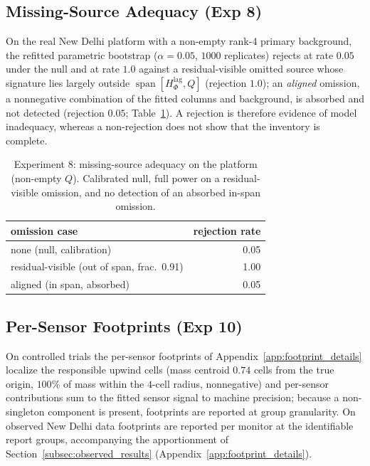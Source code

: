 \subsection{Missing-Source Adequacy (Exp 8)}
\label{subsec:results_missing_source}
On the real New Delhi platform with a non-empty rank-4 primary background, the
refitted parametric bootstrap ($\alpha=0.05$, $1000$ replicates) rejects at rate
$0.05$ under the null and at rate $1.0$ against a residual-visible omitted
source whose signature lies largely outside
$\operatorname{span}[H_\Phi^{\mathrm{lag}},Q]$ (rejection $1.0$); an \emph{aligned}
omission, a nonnegative combination of the fitted columns and background, is absorbed
and not detected (rejection $0.05$; Table~\ref{tab:results_missing}). A rejection is
therefore evidence of model inadequacy, whereas a non-rejection does not show that the
inventory is complete.
\begin{table}[t]
\centering
\footnotesize
\caption{Experiment 8: missing-source adequacy on the platform (non-empty $Q$).
Calibrated null, full power on a residual-visible omission, and no detection of an
absorbed in-span omission.}
\label{tab:results_missing}
\begin{tabular}{lr}
\toprule
omission case & rejection rate \\
\midrule
none (null, calibration) & 0.05 \\
residual-visible (out of span, frac.\ 0.91) & 1.00 \\
aligned (in span, absorbed) & 0.05 \\
\bottomrule
\end{tabular}
\end{table}

\subsection{Per-Sensor Footprints (Exp 10)}
\label{subsec:results_footprints}
On controlled trials the per-sensor footprints of
Appendix~\ref{app:footprint_details} localize the responsible upwind cells (mass
centroid $0.74$ cells from the true origin, $100\%$ of mass within the $4$-cell
radius, nonnegative) and per-sensor contributions sum to the fitted sensor signal to
machine precision; because a non-singleton component is present, footprints are
reported at group granularity. On observed New Delhi data footprints are reported per
monitor at the identifiable report groups, accompanying the apportionment of
Section~\ref{subsec:observed_results}
(Appendix~\ref{app:footprint_details}).

